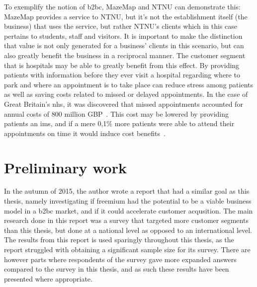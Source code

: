 To exemplify the notion of \gls{b2bc}, MazeMap and NTNU can demonstrate this: MazeMap provides a service to NTNU, but it's not the establishment itself (the business) that uses the service, but rather NTNU's clients which in this case pertains to students, staff and visitors. It is important to make the distinction that value is not only generated for a business' clients in this scenario, but can also greatly benefit the business in a reciprocal manner. The customer segment that is hospitals may be able to greatly benefit from this effect. By providing patients with information before they ever visit a hospital regarding where to park and where an appointment is to take place can reduce stress among patients as well as saving costs related to missed or delayed appointments. In the case of Great Britain's \gls{nhs}, it was discovered that missed appointments accounted for annual costs of 800 million GBP~\cite{lucyjohnston2012}. This cost may be lowered by providing patients an \gls{ims}, and if a mere 0,1\% more patients were able to attend their appointments on time it would induce cost benefits~\cite{mazemaphospitals2015}.


\section{Preliminary work}
In the autumn of 2015, the author wrote a report that had a similar goal as this thesis, namely investigating if freemium had the potential to be a viable business model in a \gls{b2bc} market, and if it could accelerate customer acqusition. The main research done in this report was a survey that targeted more customer segments than this thesis, but done at a national level as opposed to an international level. The results from this report is used sparingly throughout this thesis, as the report struggled with obtaining a significant sample size for its survey. There are however parts where respondents of the survey gave more expanded answers compared to the survey in this thesis, and as such these results have been presented where appropriate. 
